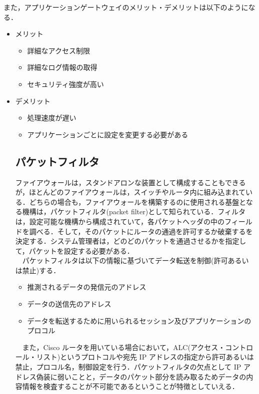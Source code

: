\documentclass[a4j,titlepage]{jarticle}
\begin{document}
  また，アプリケーションゲートウェイのメリット・デメリットは以下のようになる．

  \begin{itemize}
  \item メリット
    \begin{itemize}
    \item 詳細なアクセス制限

    \item 詳細なログ情報の取得

    \item セキュリティ強度が高い

    \end{itemize}

  \item デメリット

    \begin{itemize}
    \item 処理速度が遅い

    \item アプリケーションごとに設定を変更する必要がある

   \end{itemize}

\subsection{パケットフィルタ}
ファイアウォールは，スタンドアロンな装置として構成することもできるが，ほとんどのファイアウォールは，スイッチやルータ内に組み込まれている．どちらの場合も，ファイアウォールを構築するのに使用される基盤となる機構は，パケットフィルタ(packet filter)として知られている．フィルタは，設定可能な機構から構成されていて，各パケットヘッダの中のフィールドを調べる．そして，そのパケットにルータの通過を許可するか破棄するを決定する．システム管理者は，どのどのパケットを通過させるかを指定して，パケットを設定する必要がある\cite{bib:filtertext}．\\
　パケットフィルタは以下の情報に基づいてデータ転送を制御(許可あるいは禁止)する．

\begin{itemize}
\item 推測されるデータの発信元のアドレス
\item データの送信先のアドレス
\item データを転送するために用いられるセッション及びアプリケーションのプロコル
\end{itemize}

　また，Cisco ルータを用いている場合において，ALC(アクセス・コントロール・リスト)というプロトコルや宛先 IP アドレスの指定から許可あるいは禁止，プロコル名，制御設定を行う．パケットフィルタの欠点として IP アドレス偽装に弱いことと，データのパケット部分を読み取るためデータの内容情報を検査することが不可能であるということが特徴としていえる．



\end{itemize}
\end{document}
